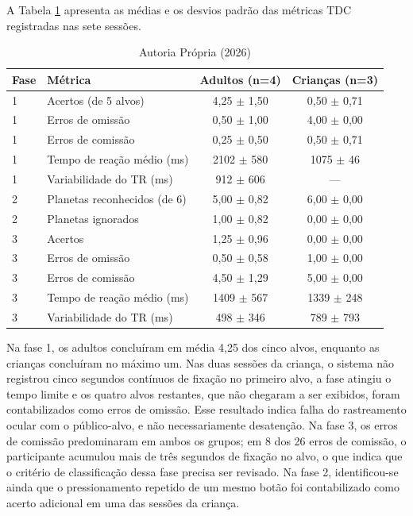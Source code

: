 \documentclass[11pt,a4paper]{article}
\newcommand{\SourceOrNote}[1]{\caption*{#1}}
\begin{document}
A Tabela \ref{tab:metricas-tdc} apresenta as médias e os desvios padrão das métricas TDC registradas nas sete sessões.

\begin{table}[H]
    \centering
    \caption{Métricas TDC por grupo (média $\pm$ desvio padrão)}
    \label{tab:metricas-tdc}
    \begin{tabular}{llcc}
        \toprule
        \textbf{Fase} & \textbf{Métrica} & \textbf{Adultos (n=4)} & \textbf{Crianças (n=3)} \\
        \midrule
        1 & Acertos (de 5 alvos)         & 4,25 $\pm$ 1,50 & 0,50 $\pm$ 0,71 \\
        1 & Erros de omissão             & 0,50 $\pm$ 1,00 & 4,00 $\pm$ 0,00 \\
        1 & Erros de comissão            & 0,25 $\pm$ 0,50 & 0,50 $\pm$ 0,71 \\
        1 & Tempo de reação médio (ms)   & 2102 $\pm$ 580  & 1075 $\pm$ 46 \\
        1 & Variabilidade do TR (ms)     & 912 $\pm$ 606   & --- \\
        2 & Planetas reconhecidos (de 6) & 5,00 $\pm$ 0,82 & 6,00 $\pm$ 0,00 \\
        2 & Planetas ignorados           & 1,00 $\pm$ 0,82 & 0,00 $\pm$ 0,00 \\
        3 & Acertos                      & 1,25 $\pm$ 0,96 & 0,00 $\pm$ 0,00 \\
        3 & Erros de omissão             & 0,50 $\pm$ 0,58 & 1,00 $\pm$ 0,00 \\
        3 & Erros de comissão            & 4,50 $\pm$ 1,29 & 5,00 $\pm$ 0,00 \\
        3 & Tempo de reação médio (ms)   & 1409 $\pm$ 567  & 1339 $\pm$ 248 \\
        3 & Variabilidade do TR (ms)     & 498 $\pm$ 346   & 789 $\pm$ 793 \\
        \bottomrule
    \end{tabular}
    \SourceOrNote{Autoria Própria (2026)}
\end{table}

Na fase 1, os adultos concluíram em média 4,25 dos cinco alvos, enquanto as crianças concluíram no máximo um. Nas duas sessões da criança, o sistema não registrou cinco segundos contínuos de fixação no primeiro alvo, a fase atingiu o tempo limite e os quatro alvos restantes, que não chegaram a ser exibidos, foram contabilizados como erros de omissão. Esse resultado indica falha do rastreamento ocular com o público-alvo, e não necessariamente desatenção. Na fase 3, os erros de comissão predominaram em ambos os grupos; em 8 dos 26 erros de comissão, o participante acumulou mais de três segundos de fixação no alvo, o que indica que o critério de classificação dessa fase precisa ser revisado. Na fase 2, identificou-se ainda que o pressionamento repetido de um mesmo botão foi contabilizado como acerto adicional em uma das sessões da criança.
\end{document}
